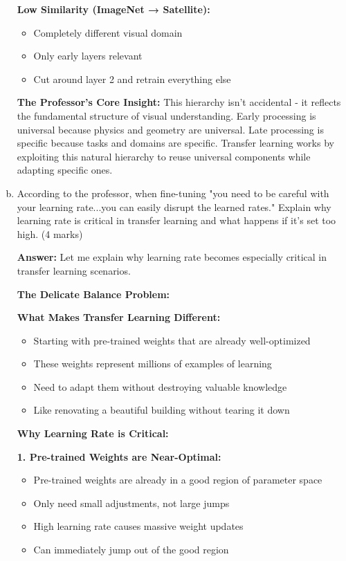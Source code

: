 \documentclass[12pt]{article}
\newcommand{\answer}[1]{{\color{answercolor}\textbf{Answer:} #1}}
\newcommand{\explanation}[1]{{\color{explanationcolor}#1}}
\begin{document}
\begin{enumerate}[(a)]
{{    \textbf{Low Similarity (ImageNet → Satellite):}
    \begin{itemize}
        \item Completely different visual domain
        \item Only early layers relevant
        \item Cut around layer 2 and retrain everything else
    \end{itemize}
    }
    
    \textbf{The Professor's Core Insight:}
    \explanation{
    This hierarchy isn't accidental - it reflects the fundamental structure of visual understanding. Early processing is universal because physics and geometry are universal. Late processing is specific because tasks and domains are specific. Transfer learning works by exploiting this natural hierarchy to reuse universal components while adapting specific ones.
    }
    }
    
    \item According to the professor, when fine-tuning "you need to be careful with your learning rate...you can easily disrupt the learned rates." Explain why learning rate is critical in transfer learning and what happens if it's set too high. \hfill (4 marks)
    
    \answer{
    Let me explain why learning rate becomes especially critical in transfer learning scenarios.
    
    \textbf{The Delicate Balance Problem:}
    
    \explanation{
    \textbf{What Makes Transfer Learning Different:}
    \begin{itemize}
        \item Starting with pre-trained weights that are already well-optimized
        \item These weights represent millions of examples of learning
        \item Need to adapt them without destroying valuable knowledge
        \item Like renovating a beautiful building without tearing it down
    \end{itemize}
    }
    
    \textbf{Why Learning Rate is Critical:}
    
    \explanation{
    \textbf{1. Pre-trained Weights are Near-Optimal:}
    \begin{itemize}
        \item Pre-trained weights are already in a good region of parameter space
        \item Only need small adjustments, not large jumps
        \item High learning rate causes massive weight updates
        \item Can immediately jump out of the good region
    \end{itemize}
    
}}
\end{enumerate}
\end{document}
